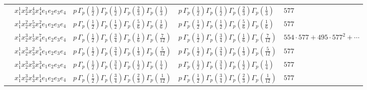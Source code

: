 \documentclass[11pt]{article}
\begin{document}
\begin{table}[ht]
{\begin{tabular}{@{}lllll@{}}
 & $x_{1}^{1} x_{2}^{2} x_{3}^{4} x_{4}^{4}  e_{1} e_{2} e_{3} e_{4}$ & $p \, \Gamma_p \left( \frac{1}{2} \right) \Gamma_p \left( \frac{1}{2} \right) \Gamma_p \left( \frac{2}{3} \right) \Gamma_p \left( \frac{1}{3} \right)$ & $p \, \Gamma_p \left( \frac{1}{2} \right) \Gamma_p \left( \frac{1}{2} \right) \Gamma_p \left( \frac{2}{3} \right) \Gamma_p \left( \frac{1}{3} \right)$ & $577$ \\
 & $x_{1}^{1} x_{2}^{2} x_{3}^{5} x_{4}^{2}  e_{1} e_{2} e_{3} e_{4}$ & $p \, \Gamma_p \left( \frac{1}{2} \right) \Gamma_p \left( \frac{1}{2} \right) \Gamma_p \left( \frac{5}{6} \right) \Gamma_p \left( \frac{1}{6} \right)$ & $p \, \Gamma_p \left( \frac{1}{2} \right) \Gamma_p \left( \frac{1}{2} \right) \Gamma_p \left( \frac{5}{6} \right) \Gamma_p \left( \frac{1}{6} \right)$ & $577$ \\
 & $x_{1}^{1} x_{2}^{3} x_{3}^{1} x_{4}^{7}  e_{1} e_{2} e_{3} e_{4}$ & $p \, \Gamma_p \left( \frac{1}{2} \right) \Gamma_p \left( \frac{3}{4} \right) \Gamma_p \left( \frac{1}{6} \right) \Gamma_p \left( \frac{7}{12} \right)$ & $p \, \Gamma_p \left( \frac{1}{2} \right) \Gamma_p \left( \frac{3}{4} \right) \Gamma_p \left( \frac{1}{6} \right) \Gamma_p \left( \frac{7}{12} \right)$ & $554{\cdot}577{+}495{\cdot}577^{2}{+}\cdots$ \\
 & $x_{1}^{1} x_{2}^{3} x_{3}^{2} x_{4}^{5}  e_{1} e_{2} e_{3} e_{4}$ & $p \, \Gamma_p \left( \frac{1}{2} \right) \Gamma_p \left( \frac{3}{4} \right) \Gamma_p \left( \frac{1}{3} \right) \Gamma_p \left( \frac{5}{12} \right)$ & $p \, \Gamma_p \left( \frac{1}{2} \right) \Gamma_p \left( \frac{3}{4} \right) \Gamma_p \left( \frac{1}{3} \right) \Gamma_p \left( \frac{5}{12} \right)$ & $577$ \\
 & $x_{1}^{1} x_{2}^{3} x_{3}^{3} x_{4}^{3}  e_{1} e_{2} e_{3} e_{4}$ & $p \, \Gamma_p \left( \frac{1}{2} \right) \Gamma_p \left( \frac{3}{4} \right) \Gamma_p \left( \frac{1}{2} \right) \Gamma_p \left( \frac{1}{4} \right)$ & $p \, \Gamma_p \left( \frac{1}{2} \right) \Gamma_p \left( \frac{3}{4} \right) \Gamma_p \left( \frac{1}{2} \right) \Gamma_p \left( \frac{1}{4} \right)$ & $577$ \\
 & $x_{1}^{1} x_{2}^{3} x_{3}^{4} x_{4}^{1}  e_{1} e_{2} e_{3} e_{4}$ & $p \, \Gamma_p \left( \frac{1}{2} \right) \Gamma_p \left( \frac{3}{4} \right) \Gamma_p \left( \frac{2}{3} \right) \Gamma_p \left( \frac{1}{12} \right)$ & $p \, \Gamma_p \left( \frac{1}{2} \right) \Gamma_p \left( \frac{3}{4} \right) \Gamma_p \left( \frac{2}{3} \right) \Gamma_p \left( \frac{1}{12} \right)$ & $577$ \\

\end{tabular}}
\end{table}
\end{document}
